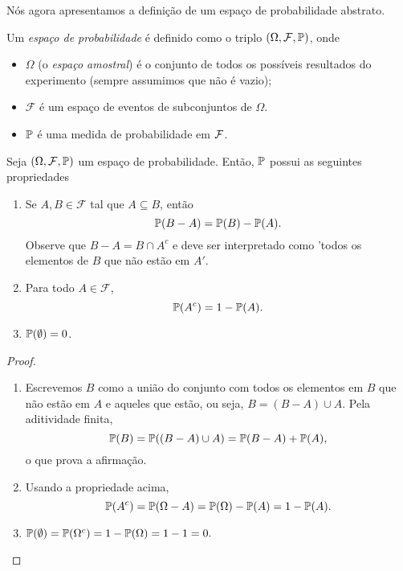 Nós agora apresentamos a definição de um espaço de probabilidade abstrato.
\begin{definition}
\label{def: probability space}
Um \emph{espaço de probabilidade} é definido como o triplo $(\Omega, \mathcal{F}, \mathbb{P})$, onde
    \begin{itemize}
        \item $\Omega$ (o \emph{espaço amostral}) é o conjunto de todos os possíveis resultados do experimento (sempre assumimos que não é vazio);
        \item $\mathcal{F}$ é um espaço de eventos de subconjuntos de $\Omega$. 
        \item $\mathbb{P}$ é uma medida de probabilidade em $ \mathcal F $.
    \end{itemize}
\end{definition}

\begin{proposition}
\label{prop: basic properties of probability}
Seja $(\Omega, \mathcal{F}, \mathbb{P})$ um espaço de probabilidade. Então, $\mathbb{P}$ possui as seguintes propriedades
\begin{enumerate}
    \item Se $A, B \in \mathcal{F}$ tal que $A \subseteq B$, então 
    \[ \mathbb{P}(B - A) = \mathbb{P}(B) - \mathbb{P}(A).\]
    Observe que $B - A = B \cap A^c$ e deve ser interpretado como 'todos os elementos de $B$ que não estão em $A'$.
    \item Para todo $A \in \mathcal{F}$,
    \[ \mathbb{P}(A^c) = 1 - \mathbb{P}(A).\]
    \item $\mathbb{P}(\emptyset) = 0$.
\end{enumerate}
\end{proposition}

\begin{proof}
~
    \begin{enumerate}
        \item Escrevemos $B$ como a união do conjunto com todos os elementos em $B$ que não estão em $A$ e aqueles que estão, ou seja, $B = (B - A) \cup A$. Pela aditividade finita,
        \[ \mathbb{P}(B) = \mathbb{P}((B - A) \cup A) = \mathbb{P}(B - A) + \mathbb{P}(A),\]
        o que prova a afirmação.
        \item Usando a propriedade acima,
        \[\mathbb{P}(A^c) = \mathbb{P}(\Omega - A) = \mathbb{P}(\Omega) - \mathbb{P}(A) = 1 - \mathbb{P}(A).
        \]
    \item $\mathbb{P}(\emptyset) = \mathbb{P}(\Omega^c) = 1 - \mathbb{P}(\Omega) = 1 - 1 = 0.$
    \end{enumerate}
\end{proof}

